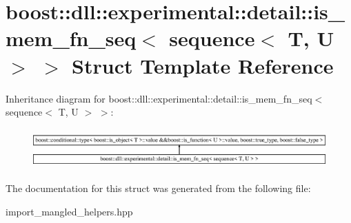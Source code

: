 \hypertarget{a00175}{}\section{boost\+:\+:dll\+:\+:experimental\+:\+:detail\+:\+:is\+\_\+mem\+\_\+fn\+\_\+seq$<$ sequence$<$ T, U $>$ $>$ Struct Template Reference}
\label{a00175}
Inheritance diagram for boost\+:\+:dll\+:\+:experimental\+:\+:detail\+:\+:is\+\_\+mem\+\_\+fn\+\_\+seq$<$ sequence$<$ T, U $>$ $>$\+:\begin{figure}[H]
\begin{center}
\leavevmode
\includegraphics[height=1.566434cm]{a00175}
\end{center}
\end{figure}


The documentation for this struct was generated from the following file\+:\begin{DoxyCompactItemize}
\item 
import\+\_\+mangled\+\_\+helpers.\+hpp\end{DoxyCompactItemize}
